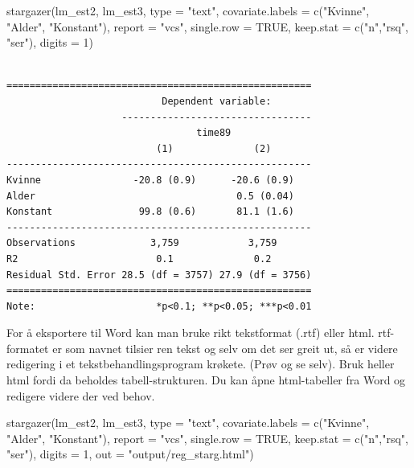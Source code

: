 \documentclass[
  norsk,
  letterpaper,
  DIV=11,
  numbers=noendperiod]{scrreprt}
\newenvironment{Shaded}{\begin{snugshade}}{\end{snugshade}}
\newcommand{\AttributeTok}[1]{\textcolor[rgb]{0.40,0.45,0.13}{#1}}
\newcommand{\ConstantTok}[1]{\textcolor[rgb]{0.56,0.35,0.01}{#1}}
\newcommand{\DecValTok}[1]{\textcolor[rgb]{0.68,0.00,0.00}{#1}}
\newcommand{\FunctionTok}[1]{\textcolor[rgb]{0.28,0.35,0.67}{#1}}
\newcommand{\NormalTok}[1]{\textcolor[rgb]{0.00,0.23,0.31}{#1}}
\newcommand{\StringTok}[1]{\textcolor[rgb]{0.13,0.47,0.30}{#1}}
\theoremstyle{definition}
\theoremstyle{remark}
\begin{document}
\begin{Shaded}
\begin{Highlighting}[]
\FunctionTok{stargazer}\NormalTok{(lm\_est2, lm\_est3, }
          \AttributeTok{type =} \StringTok{"text"}\NormalTok{, }
          \AttributeTok{covariate.labels =} \FunctionTok{c}\NormalTok{(}\StringTok{"Kvinne"}\NormalTok{, }\StringTok{"Alder"}\NormalTok{, }\StringTok{"Konstant"}\NormalTok{),}
          \AttributeTok{report =} \StringTok{"vcs"}\NormalTok{,}
          \AttributeTok{single.row =} \ConstantTok{TRUE}\NormalTok{, }
          \AttributeTok{keep.stat =} \FunctionTok{c}\NormalTok{(}\StringTok{"n"}\NormalTok{,}\StringTok{"rsq"}\NormalTok{, }\StringTok{"ser"}\NormalTok{),}
          \AttributeTok{digits =} \DecValTok{1}\NormalTok{)}
\end{Highlighting}
\end{Shaded}

\begin{verbatim}

=====================================================
                           Dependent variable:       
                    ---------------------------------
                                 time89              
                          (1)              (2)       
-----------------------------------------------------
Kvinne                -20.8 (0.9)      -20.6 (0.9)   
Alder                                   0.5 (0.04)   
Konstant               99.8 (0.6)       81.1 (1.6)   
-----------------------------------------------------
Observations             3,759            3,759      
R2                        0.1              0.2       
Residual Std. Error 28.5 (df = 3757) 27.9 (df = 3756)
=====================================================
Note:                     *p<0.1; **p<0.05; ***p<0.01
\end{verbatim}

For å eksportere til Word kan man bruke rikt tekstformat (.rtf) eller
html. rtf-formatet er som navnet tilsier ren tekst og selv om det ser
greit ut, så er videre redigering i et tekstbehandlingsprogram krøkete.
(Prøv og se selv). Bruk heller html fordi da beholdes tabell-strukturen.
Du kan åpne html-tabeller fra Word og redigere videre der ved behov.

\begin{Shaded}
\begin{Highlighting}[]
\FunctionTok{stargazer}\NormalTok{(lm\_est2, lm\_est3, }
          \AttributeTok{type =} \StringTok{"text"}\NormalTok{,}
          \AttributeTok{covariate.labels =} \FunctionTok{c}\NormalTok{(}\StringTok{"Kvinne"}\NormalTok{, }\StringTok{"Alder"}\NormalTok{, }\StringTok{"Konstant"}\NormalTok{),}
          \AttributeTok{report =} \StringTok{"vcs"}\NormalTok{,}
          \AttributeTok{single.row =} \ConstantTok{TRUE}\NormalTok{, }
          \AttributeTok{keep.stat =} \FunctionTok{c}\NormalTok{(}\StringTok{"n"}\NormalTok{,}\StringTok{"rsq"}\NormalTok{, }\StringTok{"ser"}\NormalTok{),}
          \AttributeTok{digits =} \DecValTok{1}\NormalTok{, }
          \AttributeTok{out =} \StringTok{"output/reg\_starg.html"}\NormalTok{)}
\end{Highlighting}
\end{Shaded}
\end{document}
